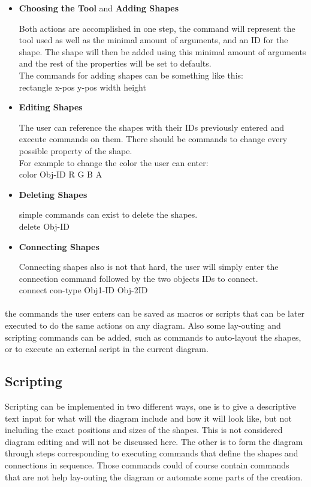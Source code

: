 \begin{itemize}
\item {{\bf Choosing the Tool} and {\bf Adding Shapes}}
\par \noindent
Both actions are accomplished in one step, the command will represent the tool used as well as the minimal amount of arguments, and an ID for the shape. The shape will then be added using this minimal amount of arguments and the rest of the properties will be set to defaults.\\
The commands for adding shapes can be something like this:\\
rectangle x-pos y-pos width height

\item {\bf Editing Shapes}
\par \noindent
The user can reference the shapes with their IDs previously entered and execute commands on them. There should be commands to change every possible property of the shape.\\
For example to change the color the user can enter:\\
color Obj-ID R G B A

\item {\bf Deleting Shapes}
\par \noindent
simple commands can exist to delete the shapes.\\
delete Obj-ID

\item {\bf Connecting Shapes}
\par \noindent
Connecting shapes also is not that hard, the user will simply enter the connection command followed by the two objects IDs to connect.\\
connect con-type Obj1-ID Obj-2ID

\end{itemize}

\paragraph{}
the commands the user enters can be saved as macros or scripts that can be later executed to do the same actions on any diagram. Also some lay-outing and scripting commands can be added, such as commands to auto-layout the shapes, or to execute an external script in the current diagram.

\subsection{Scripting}
\par \noindent
Scripting can be implemented in two different ways, one is to give a descriptive text input for what will the diagram include and how it will look like, but not including the exact positions and sizes of the shapes. This is not considered diagram editing and will not be discussed here. The other is to form the diagram through steps corresponding to executing commands that define the shapes and connections in sequence. Those commands could of course contain commands that are not help lay-outing the diagram or automate some parts of the creation.










